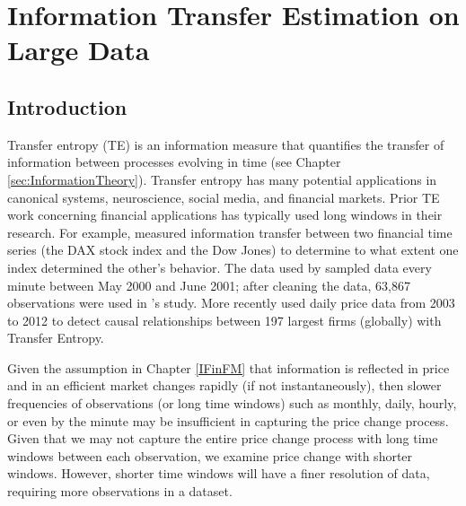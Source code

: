\chapter{ Information Transfer Estimation on Large Data} \label{Chapter:PyIF}

\section{Introduction}


Transfer entropy (TE) is an information measure that quantifies the transfer of information between processes evolving in time (see Chapter \ref{sec:InformationTheory}). Transfer entropy has many potential applications in canonical systems, neuroscience, social media, and financial markets. Prior TE work concerning financial applications has typically used long windows in their research. For example, \cite{Kantz} measured information transfer between two financial time series (the DAX stock index and the Dow Jones) to determine to what extent one index determined the other's behavior. The data used by \cite{Kantz} sampled data every minute between May 2000 and June 2001; after cleaning the data, 63,867 observations were used in \cite{Kantz}'s study.  More recently \cite{Sandoval} used daily price data from 2003 to 2012 to detect causal relationships between 197 largest firms (globally) with Transfer Entropy.

Given the assumption in Chapter \ref{IFinFM} that information is reflected in price and in an efficient market changes rapidly (if not instantaneously), then slower frequencies of observations (or long time windows) such as monthly, daily, hourly, or even by the minute may be insufficient in capturing the price change process.  Given that we may not capture the entire price change process with long time windows between each observation, we examine price change with shorter windows.  However, shorter time windows will have a finer resolution of data, requiring more observations in a dataset. 

